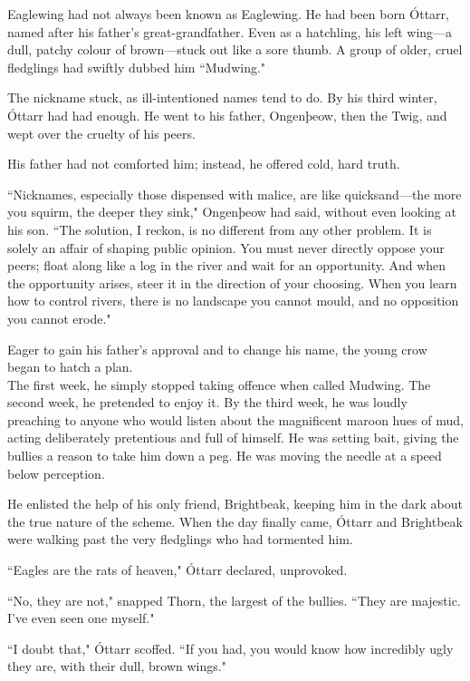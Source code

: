 Eaglewing had not always been known as Eaglewing.
He had been born Óttarr, named after his father's great-grandfather.
Even as a hatchling, his left wing---a dull, patchy colour of brown---stuck out like a sore thumb.
A group of older, cruel fledglings had swiftly dubbed him ``Mudwing."

The nickname stuck, as ill-intentioned names tend to do.
By his third winter, Óttarr had had enough.
He went to his father, Ongenþeow, then the Twig, and wept over the cruelty of his peers.

His father had not comforted him; instead, he offered cold, hard truth.

``Nicknames, especially those dispensed with malice, are like quicksand---the more you squirm, the deeper they sink," Ongenþeow had said, without even looking at his son.
``The solution, I reckon, is no different from any other problem.
It is solely an affair of shaping public opinion.
You must never directly oppose your peers; float along like a log in the river and wait for an opportunity.
And when the opportunity arises, steer it in the direction of your choosing.
When you learn how to control rivers, there is no landscape you cannot mould, and no opposition you cannot erode."

Eager to gain his father's approval and to change his name, the young crow began to hatch a plan.\\

The first week, he simply stopped taking offence when called Mudwing.
The second week, he pretended to enjoy it.
By the third week, he was loudly preaching to anyone who would listen about the magnificent maroon hues of mud, acting deliberately pretentious and full of himself.
He was setting bait, giving the bullies a reason to take him down a peg.
He was moving the needle at a speed below perception.

He enlisted the help of his only friend, Brightbeak, keeping him in the dark about the true nature of the scheme.
When the day finally came, Óttarr and Brightbeak were walking past the very fledglings who had tormented him.

``Eagles are the rats of heaven," Óttarr declared, unprovoked.

``No, they are not," snapped Thorn, the largest of the bullies.
``They are majestic.
I've even seen one myself."

``I doubt that," Óttarr scoffed.
``If you had, you would know how incredibly ugly they are, with their dull, brown wings."

